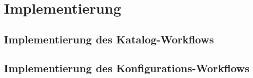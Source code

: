 \chapter{Implementierung}\label{chapter_5}

\section{Implementierung des Katalog-Workflows}
\section{Implementierung des Konfigurations-Workflows}
